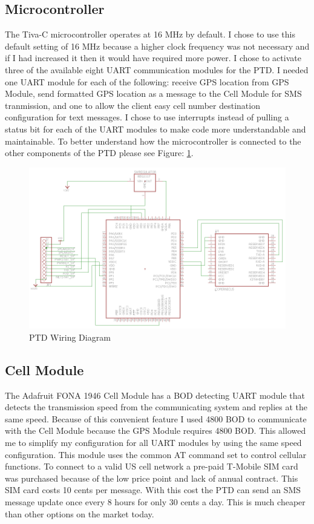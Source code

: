 \documentclass[11pt]{article}
\begin{document}
\subsection{Microcontroller} 
The Tiva-C microcontroller operates at 16 MHz by default. I chose to use this default setting of 16 MHz because a higher clock frequency was not necessary and 
if I had increased it then it would have required more power. I chose to activate three of the available eight UART communication modules for the PTD. I needed 
one UART module for each of the following: receive GPS location from GPS Module, send formatted GPS location as a message to the Cell Module for SMS tranmission,
and one to allow the client easy cell number destination configuration for text messages. I chose to use interrupts instead of pulling a status bit for each of
the UART modules to make code more understandable and maintainable. To better understand how the microcontroller is connected to the other components of the PTD please see
Figure: \ref{fig:wiring_diagram}. 

\begin{figure}
    \centering
        \includegraphics[scale=0.5]{../documentation/PTD_Eagle_Schematic.png}
    \caption{PTD Wiring Diagram}
    \label{fig:wiring_diagram}
\end{figure}


\subsection{Cell Module}
The Adafruit FONA 1946 Cell Module has a BOD detecting UART module that detects the transmission speed from the communicating system and 
replies at the same speed. Because of this convenient feature I used 4800 BOD to communicate with the Cell Module because the GPS Module requires 4800 BOD. This 
allowed me to simplify my configuration for all UART modules by using the same speed configuration. This module uses the common AT command set to
control cellular functions. To connect to a valid US cell network a pre-paid T-Mobile SIM card was purchased because of the low price point and lack of annual contract. 
This SIM card costs 10 cents per message. With this cost the PTD can send an SMS message update once every 8 hours for only 30 cents a day. This is much cheaper than other options on 
the market today. 
\end{document}
